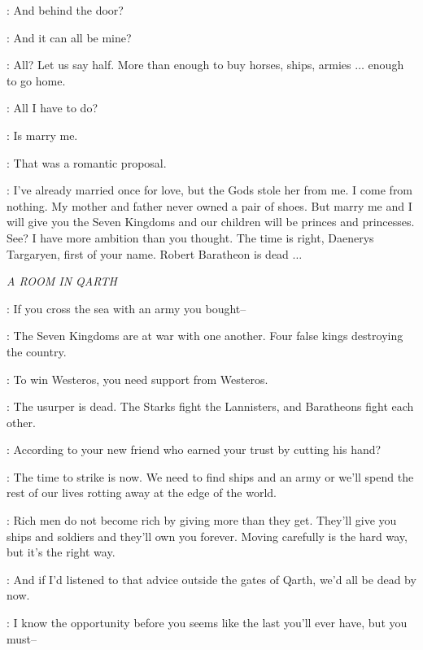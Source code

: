 
\DAENERYS: And behind the door? 


\DAENERYS: And it can all be mine? 

\XARO: All? Let us say half. More than enough to buy horses, ships, armies $\ldots$ enough to go home. 

\DAENERYS: All I have to do? 

\XARO: Is marry me. 

\DAENERYS: That was a romantic proposal. 

\XARO: I've already married once for love, but the Gods stole her from me. I come from nothing. My mother and father never owned a pair of shoes. But marry me and I will give you the Seven Kingdoms and our children will be princes and princesses. See? I have more ambition than you thought. The time is right, Daenerys Targaryen, first of your name. Robert Baratheon is dead $\ldots$ 



\scene

\textit{A ROOM IN QARTH} 


\JORAH: If you cross the sea with an army you bought-- 

\DAENERYS: The Seven Kingdoms are at war with one another. Four false kings destroying the country. 

\JORAH: To win Westeros, you need support from Westeros. 

\DAENERYS: The usurper is dead. The Starks fight the Lannisters, and Baratheons fight each other. 

\JORAH: According to your new friend who earned your trust by cutting his hand? 

\DAENERYS: The time to strike is now. We need to find ships and an army or we'll spend the rest of our lives rotting away at the edge of the world. 

\JORAH: Rich men do not become rich by giving more than they get. They'll give you ships and soldiers and they'll own you forever. Moving carefully is the hard way, but it's the right way. 

\DAENERYS: And if I'd listened to that advice outside the gates of Qarth, we'd all be dead by now. 

\JORAH: I know the opportunity before you seems like the last you'll ever have, but you must--  

